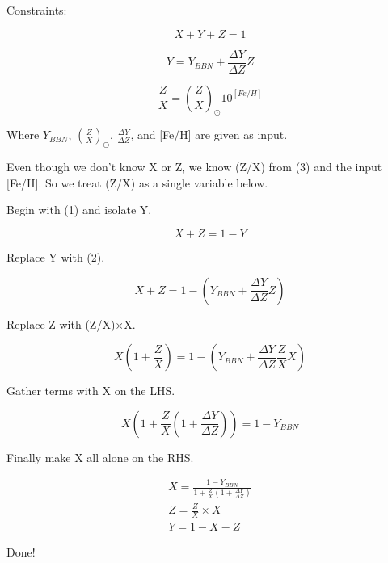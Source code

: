 \documentclass{article}
\begin{document}
Constraints:

\begin{equation}
X+Y+Z = 1
\end{equation}

\begin{equation}
  Y = Y_{BBN} + \frac{\Delta Y}{\Delta Z} Z
\end{equation}

\begin{equation}
\frac{Z}{X} = \left(\frac{Z}{X}\right)_{\odot} 10^{[Fe/H]}
\end{equation}

Where $Y_{BBN}$, $\left(\frac{Z}{X}\right)_{\odot}$, $\frac{\Delta Y}{\Delta Z}$, and [Fe/H] are given as input.


Even though we don't know X or Z, we know (Z/X) from (3) and the input [Fe/H]. So we treat (Z/X) as a single variable below.

Begin with (1) and isolate Y.

\begin{equation}
  X+Z=1-Y
\end{equation}

Replace Y with (2).

\begin{equation}
  X +Z = 1 - (Y_{BBN} + \frac{\Delta Y}{\Delta Z} Z)
\end{equation}

Replace Z with (Z/X)$\times$X.

 \begin{equation}
 X ( 1 + \frac{Z}{X}) = 1 - (Y_{BBN} + \frac{\Delta Y}{\Delta Z} \frac{Z}{X} X)
\end{equation}

Gather terms with X on the LHS.

\begin{equation}
 X ( 1 + \frac{Z}{X} ( 1 + \frac{\Delta Y}{\Delta Z})) = 1 - Y_{BBN}
\end{equation}

Finally make X all alone on the RHS.

\begin{align}
  X = \frac{1-Y_{BBN}}{ 1 + \frac{Z}{X} ( 1 + \frac{\Delta Y}{\Delta Z})} \\
  Z= \frac{Z}{X} \times X\\
  Y= 1 - X - Z
\end{align}

Done!
\end{document}
